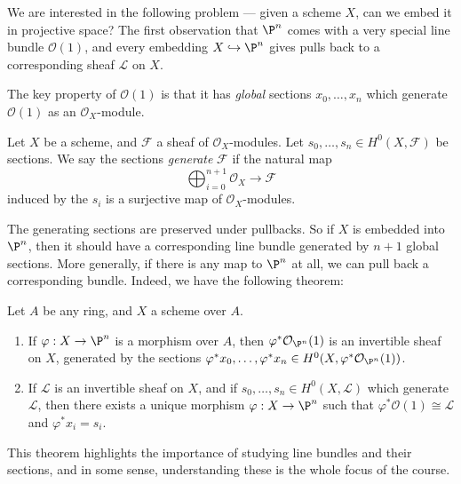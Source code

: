 \documentclass[a4paper]{article}
\begin{document}
We are interested in the following problem --- given a scheme $X$, can we embed it in projective space? The first observation that $\P^n$ comes with a very special line bundle $\mathcal{O}(1)$, and every embedding $X \hookrightarrow \P^n$ gives pulls back to a corresponding sheaf $\mathcal{L}$ on $X$.

The key property of $\mathcal{O}(1)$ is that it has \emph{global} sections $x_0, \ldots, x_n$ which generate $\mathcal{O}(1)$ as an $\mathcal{O}_X$-module.

\begin{defi}
  Let $X$ be a scheme, and $\mathcal{F}$ a sheaf of $\mathcal{O}_X$-modules. Let $s_0, \ldots, s_n \in H^0(X, \mathcal{F})$ be sections. We say the sections \emph{generate} $\mathcal{F}$ if the natural map
  \[
    \bigoplus_{i = 0}^{n + 1} \mathcal{O}_X \to \mathcal{F}
  \]
  induced by the $s_i$ is a surjective map of $\mathcal{O}_X$-modules.
\end{defi}

The generating sections are preserved under pullbacks. So if $X$ is embedded into $\P^n$, then it should have a corresponding line bundle generated by $n + 1$ global sections. More generally, if there is any map to $\P^n$ at all, we can pull back a corresponding bundle. Indeed, we have the following theorem:
\begin{thm}
  Let $A$ be any ring, and $X$ a scheme over $A$.
  \begin{enumerate}
    \item If $\varphi: X \to \P^n$ is a morphism over $A$, then $\varphi^* \mathcal{O}_{\P^n}(1)$ is an invertible sheaf on $X$, generated by the sections $\varphi^* x_0, \ldots, \varphi^* x_n \in H^0(X, \varphi^* \mathcal{O}_{\P^n}(1))$.
    \item If $\mathcal{L}$ is an invertible sheaf on $X$, and if $s_0, \ldots, s_n \in H^0(X, \mathcal{L})$ which generate $\mathcal{L}$, then there exists a unique morphism $\varphi: X \to \P^n$ such that $\varphi^* \mathcal{O}(1) \cong \mathcal{L}$ and $\varphi^* x_i = s_i$.
  \end{enumerate}
\end{thm}

This theorem highlights the importance of studying line bundles and their sections, and in some sense, understanding these is the whole focus of the course.
\end{document}
